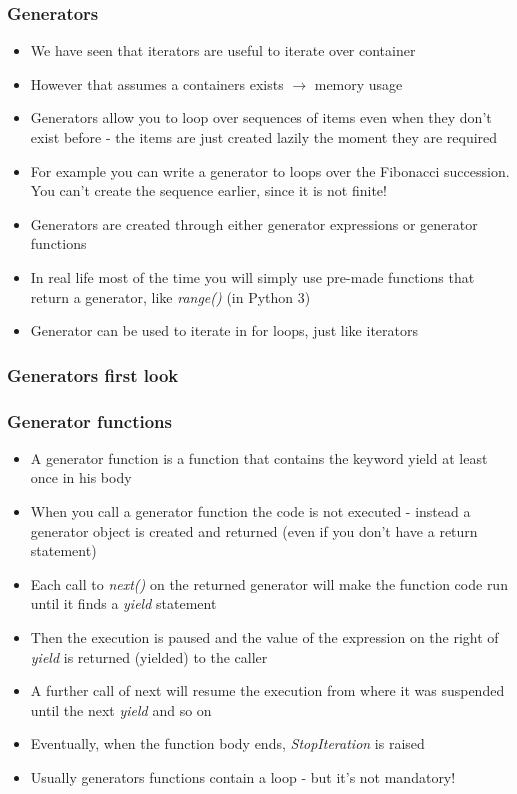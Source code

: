 \documentclass[9pt]{beamer}
\begin{document}
\begin{frame}
  \frametitle{Generators}
  
  \begin{itemize}
    \item We have seen that iterators are useful to iterate over container
    \item However that assumes a containers exists $\rightarrow$ memory usage
    \item \alert{Generators} allow you to loop over sequences of items even when
          they don't exist before - the items are just created \alert{lazily} the
          moment they are required
    \item For example you can write a generator to loops over the Fibonacci
          succession. You can't create the sequence earlier, since it is not
          finite!
    \item Generators are created through either \alert{generator expressions} or
          \alert{generator functions}
    \item In real life most of the time you will simply use pre-made functions
          that return a generator, like \emph{range()} (in Python 3)
    \item Generator can be used to iterate in for loops, just like iterators
  \end{itemize}
  
\end{frame}


\begin{frame}
  \frametitle{Generators first look}
  
\end{frame}


\begin{frame}
  \frametitle{Generator functions}
  
  \begin{itemize}
    \item A \alert{generator function} is a function that contains the keyword \alert{yield} at
          least once in his body
    \item When you call a generator function the code is not executed - instead
          a generator object is created and returned (even if you don't have a return statement)
    \item Each call to \emph{next()} on the returned generator will make the function code 
          run until it finds a \emph{yield} statement
    \item Then the execution is paused and the value of the expression on the right 
          of \emph{yield} is returned (yielded) to the caller
    \item A further call of next will resume the execution from where it was suspended
          until the next \emph{yield} and so on
    \item Eventually, when the function body ends, \emph{StopIteration} is raised
    \item Usually generators functions contain a loop - but it's not mandatory!
  \end{itemize}
  
\end{frame}
\end{document}

